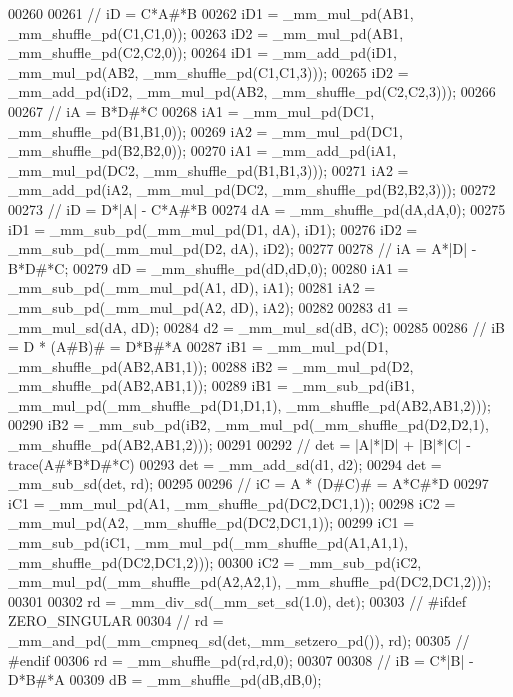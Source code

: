 \begin{DoxyCode}
00260 
00261     \textcolor{comment}{//  iD = C*A#*B}
00262     iD1 = \_mm\_mul\_pd(AB1, \_mm\_shuffle\_pd(C1,C1,0));
00263     iD2 = \_mm\_mul\_pd(AB1, \_mm\_shuffle\_pd(C2,C2,0));
00264     iD1 = \_mm\_add\_pd(iD1, \_mm\_mul\_pd(AB2, \_mm\_shuffle\_pd(C1,C1,3)));
00265     iD2 = \_mm\_add\_pd(iD2, \_mm\_mul\_pd(AB2, \_mm\_shuffle\_pd(C2,C2,3)));
00266 
00267     \textcolor{comment}{//  iA = B*D#*C}
00268     iA1 = \_mm\_mul\_pd(DC1, \_mm\_shuffle\_pd(B1,B1,0));
00269     iA2 = \_mm\_mul\_pd(DC1, \_mm\_shuffle\_pd(B2,B2,0));
00270     iA1 = \_mm\_add\_pd(iA1, \_mm\_mul\_pd(DC2, \_mm\_shuffle\_pd(B1,B1,3)));
00271     iA2 = \_mm\_add\_pd(iA2, \_mm\_mul\_pd(DC2, \_mm\_shuffle\_pd(B2,B2,3)));
00272 
00273     \textcolor{comment}{//  iD = D*|A| - C*A#*B}
00274     dA = \_mm\_shuffle\_pd(dA,dA,0);
00275     iD1 = \_mm\_sub\_pd(\_mm\_mul\_pd(D1, dA), iD1);
00276     iD2 = \_mm\_sub\_pd(\_mm\_mul\_pd(D2, dA), iD2);
00277 
00278     \textcolor{comment}{//  iA = A*|D| - B*D#*C;}
00279     dD = \_mm\_shuffle\_pd(dD,dD,0);
00280     iA1 = \_mm\_sub\_pd(\_mm\_mul\_pd(A1, dD), iA1);
00281     iA2 = \_mm\_sub\_pd(\_mm\_mul\_pd(A2, dD), iA2);
00282 
00283     d1 = \_mm\_mul\_sd(dA, dD);
00284     d2 = \_mm\_mul\_sd(dB, dC);
00285 
00286     \textcolor{comment}{//  iB = D * (A#B)# = D*B#*A}
00287     iB1 = \_mm\_mul\_pd(D1, \_mm\_shuffle\_pd(AB2,AB1,1));
00288     iB2 = \_mm\_mul\_pd(D2, \_mm\_shuffle\_pd(AB2,AB1,1));
00289     iB1 = \_mm\_sub\_pd(iB1, \_mm\_mul\_pd(\_mm\_shuffle\_pd(D1,D1,1), \_mm\_shuffle\_pd(AB2,AB1,2)));
00290     iB2 = \_mm\_sub\_pd(iB2, \_mm\_mul\_pd(\_mm\_shuffle\_pd(D2,D2,1), \_mm\_shuffle\_pd(AB2,AB1,2)));
00291 
00292     \textcolor{comment}{//  det = |A|*|D| + |B|*|C| - trace(A#*B*D#*C)}
00293     det = \_mm\_add\_sd(d1, d2);
00294     det = \_mm\_sub\_sd(det, rd);
00295 
00296     \textcolor{comment}{//  iC = A * (D#C)# = A*C#*D}
00297     iC1 = \_mm\_mul\_pd(A1, \_mm\_shuffle\_pd(DC2,DC1,1));
00298     iC2 = \_mm\_mul\_pd(A2, \_mm\_shuffle\_pd(DC2,DC1,1));
00299     iC1 = \_mm\_sub\_pd(iC1, \_mm\_mul\_pd(\_mm\_shuffle\_pd(A1,A1,1), \_mm\_shuffle\_pd(DC2,DC1,2)));
00300     iC2 = \_mm\_sub\_pd(iC2, \_mm\_mul\_pd(\_mm\_shuffle\_pd(A2,A2,1), \_mm\_shuffle\_pd(DC2,DC1,2)));
00301 
00302     rd = \_mm\_div\_sd(\_mm\_set\_sd(1.0), det);
00303 \textcolor{comment}{//     #ifdef ZERO\_SINGULAR}
00304 \textcolor{comment}{//         rd = \_mm\_and\_pd(\_mm\_cmpneq\_sd(det,\_mm\_setzero\_pd()), rd);}
00305 \textcolor{comment}{//     #endif}
00306     rd = \_mm\_shuffle\_pd(rd,rd,0);
00307 
00308     \textcolor{comment}{//  iB = C*|B| - D*B#*A}
00309     dB = \_mm\_shuffle\_pd(dB,dB,0);

\end{DoxyCode}

